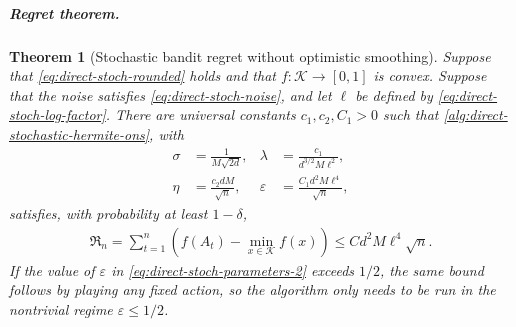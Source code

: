 \documentclass{article}
\theoremstyle{plain}
\newtheorem{theorem}{Theorem}
\theoremstyle{definition}
\theoremstyle{plain}
\newcommand{\Reg}{\mathfrak{R}}
\newcommand{\cK}{\mathcal K}
\begin{document}
\subparagraph{Regret theorem.}

\begin{theorem}[Stochastic bandit regret without optimistic smoothing]
    \label{thm:direct-stoch-main}
    Suppose that \eqref{eq:direct-stoch-rounded} holds and that
    $f:\cK\to[0,1]$ is convex.  Suppose that the noise satisfies
    \eqref{eq:direct-stoch-noise}, and let $\ell$ be defined by
    \eqref{eq:direct-stoch-log-factor}.  There are universal
    constants $c_1,c_2,C_1>0$ such that
    \cref{alg:direct-stochastic-hermite-ons}, with
    \begin{align}
        \sigma
         & =\frac{1}{M\sqrt{2d}},
         &
        \lambda
         & =\frac{c_1}{d^{3/2}M\ell^2},
        \label{eq:direct-stoch-parameters-1}
        \\
        \eta
         & =\frac{c_2dM}{\sqrt n},
         &
        \varepsilon
         & =\frac{C_1d^2M\ell^4}{\sqrt n},
        \label{eq:direct-stoch-parameters-2}
    \end{align}
    satisfies, with probability at least $1-\delta$,
    \begin{align}
        \Reg_n
        =\sum_{t=1}^n
        \left(f(A_t)-\min_{x\in\cK}f(x)\right)
        \leq
        C d^2M\ell^4\sqrt n.
        \label{eq:direct-stoch-main-regret}
    \end{align}
    If the value of $\varepsilon$ in
    \eqref{eq:direct-stoch-parameters-2} exceeds $1/2$, the same bound
    follows by playing any fixed action, so the algorithm only needs to
    be run in the nontrivial regime $\varepsilon\leq1/2$.
\end{theorem}
\end{document}
